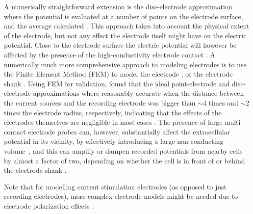 \documentclass[preprint,11pt,authoryear]{elsarticle}
\begin{document}
A numerically straightforward extension is the disc-electrode approximation where the potential is evaluated at a number of points on the electrode surface, and the average calculated \citep{ Linden2014}. 
This approach takes into account the physical extent of the electrode, but not any effect the electrode itself might have on the electric potential. 
Close to the electrode surface the electric potential will however be affected by the presence of the high-conductivity electrode contact \citep{McIntyre2001, Moulin2008}. A numerically much more comprehensive approach to modeling electrodes is to use the Finite Element Method (FEM) to model the electrode \citep{Moulin2008, Ness2015}, or the electrode shank \citep{Moffitt2005, Buccino2019b}. Using FEM for validation, \cite{Ness2015} found that the ideal point-electrode and disc-electrode approximations where reasonably accurate when the distance between the current sources and the recording electrode was bigger than $\sim$4 times and $\sim$2 times the electrode radius, respectively, indicating that the effects of the electrodes themselves are negligible in most cases \citep{Nelson2010}.
The presence of large multi-contact electrode probes can, however, substantially affect the extracellular potential in its vicinity, by effectively introducing a large non-conducting volume~\citep{Mechler2012}, and this can amplify or dampen recorded potentials from nearby cells by almost a factor of two, depending on whether the cell is in front of or behind the electrode shank \citep{Buccino2019b}.

Note that for modelling current stimulation electrodes (as opposed to just recording electrodes), more complex electrode models might be needed due to electrode polarization effects \citep{McIntyre2001, Martinsen2008, Joucla2012}.
\end{document}
